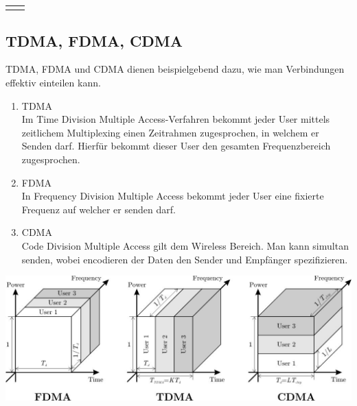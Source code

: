 \documentclass{scrartcl}
\begin{document}
\begin{center}
\begin{tabular}{c|c}
\begin{minipage}{0.3\textwidth}
        \end{minipage}
    \end{tabular}
    \end{center}

    \subsection{TDMA, FDMA, CDMA}
    TDMA, FDMA und CDMA dienen beispielgebend dazu, wie man Verbindungen effektiv einteilen kann.
    \begin{enumerate}
        \item TDMA\\
        Im Time Division Multiple Access-Verfahren bekommt jeder User mittels zeitlichem Multiplexing einen Zeitrahmen zugesprochen, in welchem er Senden darf. Hierfür bekommt dieser User den gesamten Frequenzbereich zugesprochen.
        \item FDMA\\
        In Frequency Division Multiple Access bekommt jeder User eine fixierte Frequenz auf welcher er senden darf.
        \item CDMA\\
        Code Division Multiple Access gilt dem Wireless Bereich. Man kann simultan senden, wobei encodieren der Daten den Sender und Empfänger spezifizieren.
    \end{enumerate}
    \begin{center}
        \includegraphics[width=\textwidth]{TDMACDMAFDMA.jpg}
    \end{center}
    
\end{document}
